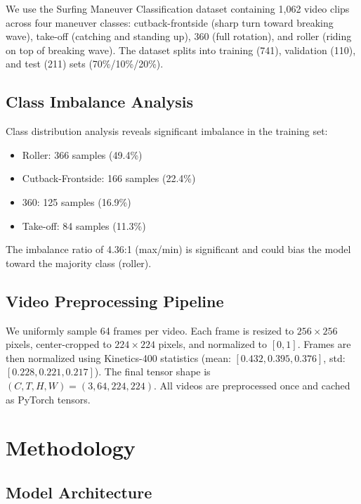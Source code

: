 \documentclass[11pt, journal]{IEEEtran}
\begin{document}
We use the Surfing Maneuver Classification dataset \cite{twonzii2024surfing} containing 1,062 video clips across four maneuver classes: cutback-frontside (sharp turn toward breaking wave), take-off (catching and standing up), 360 (full rotation), and roller (riding on top of breaking wave). The dataset splits into training (741), validation (110), and test (211) sets (70\%/10\%/20\%).

\subsection{Class Imbalance Analysis}
\label{subsec:imbalance}

Class distribution analysis reveals significant imbalance in the training set:
\begin{itemize}
    \item Roller: 366 samples (49.4\%)
    \item Cutback-Frontside: 166 samples (22.4\%)
    \item 360: 125 samples (16.9\%)
    \item Take-off: 84 samples (11.3\%)
\end{itemize}

The imbalance ratio of 4.36:1 (max/min) is significant and could bias the model toward the majority class (roller).

\subsection{Video Preprocessing Pipeline}
\label{subsec:preprocessing}

We uniformly sample 64 frames per video. Each frame is resized to $256 \times 256$ pixels, center-cropped to $224 \times 224$ pixels, and normalized to $[0, 1]$. Frames are then normalized using Kinetics-400 statistics (mean: $[0.432, 0.395, 0.376]$, std: $[0.228, 0.221, 0.217]$). The final tensor shape is $(C, T, H, W) = (3, 64, 224, 224)$. All videos are preprocessed once and cached as PyTorch tensors.

\section{Methodology}
\label{sec:methodology}

\subsection{Model Architecture}
\label{subsec:architecture}
\end{document}
